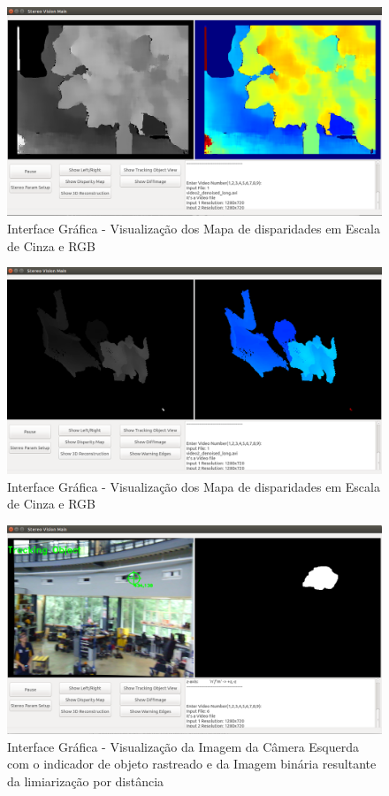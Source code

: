 \begin{figure}[H]
 	\centering
 	\includegraphics[scale=0.35]{./Resources/gui_showdisparitymap_view.png}
 	\caption{Interface Gráfica - Visualização dos Mapa de disparidades em Escala de Cinza e RGB}
 	\label{gui_showdisparitymap_view}
\end{figure}


\begin{figure}[H]
 	\centering
 	\includegraphics[scale=0.35]{./Resources/gui_show3dreconstruction_view.png}
 	\caption{Interface Gráfica - Visualização dos Mapa de disparidades em Escala de Cinza e RGB}
 	\label{gui_show3dreconstruction_view}
\end{figure}


\begin{figure}[H]
 	\centering
 	\includegraphics[scale=0.35]{./Resources/gui_show_tracking_object_view.png}
 	\caption{Interface Gráfica - Visualização da Imagem da Câmera Esquerda com o indicador de objeto rastreado e da Imagem binária resultante da limiarização por distância}
 	\label{gui_show_tracking_object_view}
\end{figure}


